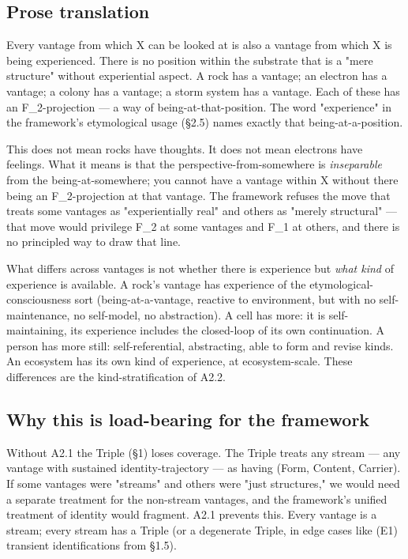 \documentclass[11pt, openany]{book}
\begin{document}
\subsection{Prose translation}

Every vantage from which X can be looked at is also a vantage from which X is being experienced. There is no position within the substrate that is a "mere structure" without experiential aspect. A rock has a vantage; an electron has a vantage; a colony has a vantage; a storm system has a vantage. Each of these has an F\_\allowbreak{}2-projection --- a way of being-at-that-position. The word "experience" in the framework's etymological usage (§2.5) names exactly that being-at-a-position.

This does not mean rocks have thoughts. It does not mean electrons have feelings. What it means is that the perspective-from-somewhere is \textit{inseparable} from the being-at-somewhere; you cannot have a vantage within X without there being an F\_\allowbreak{}2-projection at that vantage. The framework refuses the move that treats some vantages as "experientially real" and others as "merely structural" --- that move would privilege F\_\allowbreak{}2 at some vantages and F\_\allowbreak{}1 at others, and there is no principled way to draw that line.

What differs across vantages is not whether there is experience but \textit{what kind} of experience is available. A rock's vantage has experience of the etymological-consciousness sort (being-at-a-vantage, reactive to environment, but with no self-maintenance, no self-model, no abstraction). A cell has more: it is self-maintaining, its experience includes the closed-loop of its own continuation. A person has more still: self-referential, abstracting, able to form and revise kinds. An ecosystem has its own kind of experience, at ecosystem-scale. These differences are the kind-stratification of A2.2.

\subsection{Why this is load-bearing for the framework}

Without A2.1 the Triple (§1) loses coverage. The Triple treats any stream --- any vantage with sustained identity-trajectory --- as having (Form, Content, Carrier). If some vantages were "streams" and others were "just structures," we would need a separate treatment for the non-stream vantages, and the framework's unified treatment of identity would fragment. A2.1 prevents this. Every vantage is a stream; every stream has a Triple (or a degenerate Triple, in edge cases like (E1) transient identifications from §1.5).
\end{document}
